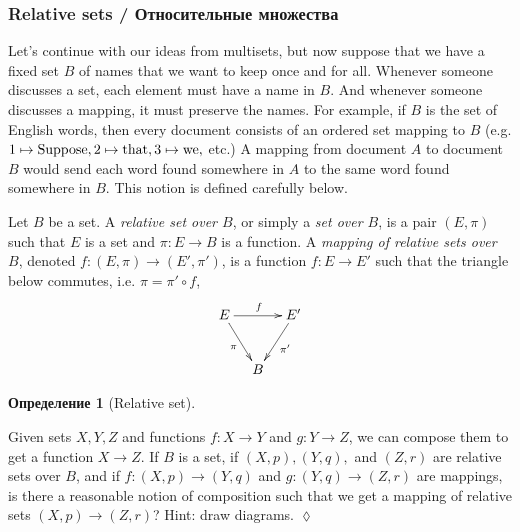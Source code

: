 \documentclass[a4paper]{book}
\def\tn{\textnormal}
\def\to{\rightarrow}
\def\taking{\colon}
\theoremstyle{myth}
\newtheorem{excENG}[envENG]{\begin{english}Exercise\end{english}}
\newtheorem{definitionENG}[envENG]{\begin{english}Definition\end{english}}
\newenvironment{exerciseENG}{\begin{excENG}}{\hspace*{\fill}$\lozenge$\end{excENG}}
\newtheorem{definitionRUS}[envRUS]{Определение}
\begin{document}
\begin{russian}

\subsubsection{Relative sets / Относительные множества}\label{sec:relative sets}

Let's continue with our ideas from multisets, but now suppose that we have a fixed set $B$ of names that we want to keep once and for all. Whenever someone discusses a set, each element must have a name in $B$. And whenever someone discusses a mapping, it must preserve the names. For example, if $B$ is the set of English words, then every document consists of an ordered set mapping to $B$ (e.g. $1\mapsto \tn{Suppose}, 2\mapsto\tn{that}, 3\mapsto\tn{we},$ etc.) A mapping from document $A$ to document $B$ would send each word found somewhere in $A$ to the same word found somewhere in $B$. This notion is defined carefully below.

 

\begin{definitionENG}\label{def:relative sets}
Let $B$ be a set. A {\em relative set over $B$}, or simply a {\em set over $B$}, is a pair $(E,\pi)$ such that $E$ is a set and $\pi\taking E\to B$ is a function. A {\em mapping of relative sets over $B$}, denoted $f\taking (E,\pi)\to(E',\pi')$, is a function $f\taking E\to E'$ such that the triangle below commutes, i.e. $\pi=\pi'\circ f$,
$$
\xymatrix@=10pt{E\ar[rr]^f\ar[rdd]_{\pi}&&E'\ar[ldd]^{\pi'}\\\\&B
}
$$
\end{definitionENG}

\begin{definitionRUS}[Relative set]\label{def:relative sets}
 
\end{definitionRUS}

\begin{exerciseENG}
Given sets $X,Y,Z$ and functions $f\taking X\to Y$ and $g\taking Y\to Z$, we can compose them to get a function $X\to Z$. If $B$ is a set, if $(X,p), (Y,q),$ and $(Z,r)$ are relative sets over $B$, and if $f\taking (X,p)\to (Y,q)$ and $g\taking (Y,q)\to (Z,r)$ are mappings, is there a reasonable notion of composition such that we get a mapping of relative sets $(X,p)\to (Z,r)$? Hint: draw diagrams.
\end{exerciseENG}


\end{russian}
\end{document}
